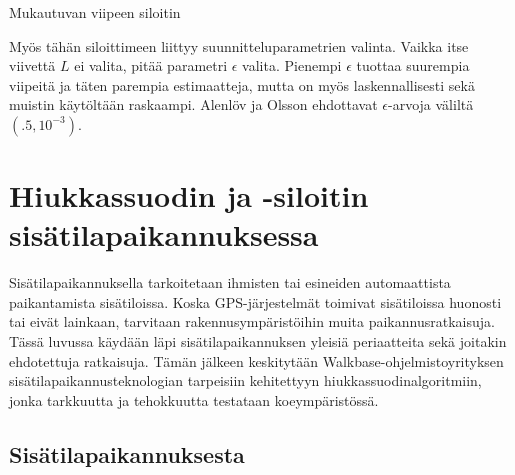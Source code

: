 \documentclass[
  12pt,
  a4paper, twoside]{book}
\begin{document}
\begin{algorithm}[H]
\label{mukautuva-siloitin}
\DontPrintSemicolon
\SetAlgoShortEnd
{}
\caption{Mukautuvan viipeen siloitin}
\end{algorithm}

Myös tähän siloittimeen liittyy suunnitteluparametrien valinta. Vaikka itse viivettä \(L\) ei valita, pitää parametri \(\epsilon\) valita. Pienempi \(\epsilon\) tuottaa suurempia viipeitä ja täten parempia estimaatteja, mutta on myös laskennallisesti sekä muistin käytöltään raskaampi. Alenlöv ja Olsson ehdottavat \(\epsilon\)-arvoja väliltä \((.5, 10^{-3})\).

\chapter{Hiukkassuodin ja -siloitin sisätilapaikannuksessa} \label{paikannusesimerkki}

Sisätilapaikannuksella tarkoitetaan ihmisten tai esineiden automaattista paikantamista sisätiloissa. Koska GPS-järjestelmät toimivat sisätiloissa huonosti tai eivät lainkaan, tarvitaan rakennusympäristöihin muita paikannusratkaisuja. Tässä luvussa käydään läpi sisätilapaikannuksen yleisiä periaatteita sekä joitakin ehdotettuja ratkaisuja. Tämän jälkeen keskitytään Walkbase-ohjelmistoyrityksen sisätilapaikannusteknologian tarpeisiin kehitettyyn hiukkassuodinalgoritmiin, jonka tarkkuutta ja tehokkuutta testataan koeympäristössä.

\section{Sisätilapaikannuksesta}
\end{document}
